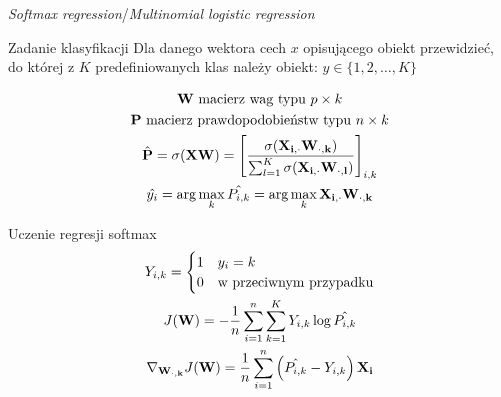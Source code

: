 \documentclass{sa}
\renewcommand{\vec}[1]{\ensuremath\mathbf{#1}}
\newcommand{\grad}{\ensuremath\nabla}
\begin{document}
\begin{frame}{\emph{Softmax regression}/\emph{Multinomial logistic regression}}
\begin{block}{Zadanie klasyfikacji}
Dla danego wektora cech $x$ opisującego obiekt przewidzieć, do której z $K$ predefiniowanych klas należy obiekt: $y\in \{1, 2, \ldots, K\}$
\end{block}
\begin{gather*}
\vec{W} \text{ macierz wag typu } p\times k \\
\vec{P} \text{ macierz prawdopodobieństw typu } n\times k \\
\hat{\vec{P}} = \sigma(\vec{X}\vec{W}) = \left[ \frac{\sigma(\vec{X_{i,\cdot}}\vec{W_{\cdot,k}})}{\sum_{l=1}^K \sigma(\vec{X_{i,\cdot}}\vec{W_{\cdot,l}})} \right]_{i,k} \\
\hat{y_i} = \arg\max_{k} \hat{P_{i,k}} = \arg\max_{k} \vec{X_{i,\cdot}}\vec{W_{\cdot,k}} \\
\end{gather*}
\end{frame}

\begin{frame}{Uczenie regresji softmax}
\begin{gather*}
Y_{i,k}=\begin{cases} 1 & y_i=k \\ 0 & \text{w przeciwnym przypadku} \end{cases} \\
J(\vec{W}) = -\frac{1}{n} \sum_{i=1}^n \sum_{k=1}^K Y_{i,k}\log\hat{P_{i,k}} \\
\grad_{\vec{W_{\cdot,k}}} J(\vec{W}) = \frac{1}{n}\sum_{i=1}^n \left(\hat{P_{i,k}} - Y_{i,k}\right)\vec{X_{i}}
\end{gather*}
\end{frame}
\end{document}
